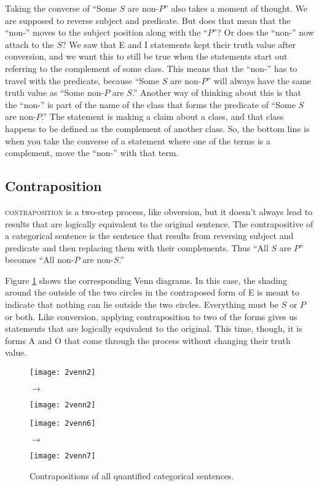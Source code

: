 Taking the converse of ``Some $S$ are non-$P$'' also takes a moment of thought. We are supposed to reverse subject and predicate. But does that mean that the ``non-'' moves to the subject position along with the ``$P$''? Or does the ``non-'' now attach to the $S$? We saw that E and I statements kept their truth value after conversion, and we want this to still be true when the statements start out referring to the complement of some class. This means that the ``non-'' has to travel with the predicate, because ``Some $S$ are non-$P$'' will always have the same truth value as ``Some non-$P$ are $S$.'' Another way of thinking about this is that the ``non-'' is part of the name of the class that forms the predicate of ``Some $S$ are non-$P$.'' The statement is making a claim about a class, and that class happens to be defined as the complement of another class. So, the bottom line is when you take the converse of a statement where one of the terms is a complement, move the ``non-'' with that term.

\subsection{Contraposition}



\textsc{\gls{contraposition}} is a two-step process, like obversion, but it doesn't always lead to results that are logically equivalent to the original sentence. The contrapositive of a categorical sentence is the sentence that results from reversing subject and predicate and then replacing them with their complements. Thus ``All $S$ are $P$'' becomes ``All non-$P$ are non-$S$.''

Figure \ref{fig:contraposition} shows the corresponding Venn diagrams. In this case, the shading around the outside of the two circles in the contraposed form of E is meant to indicate that nothing can lie outside the two circles. Everything must be $S$ or $P$ or both. Like conversion, applying contraposition to two of the forms gives us statements that are logically equivalent to the original. This time, though, it is forms A and O that come through the process without changing their truth value.


\begin{figure}[!ht]
\texttt{[image: 2venn2]}
\begin{minipage}[c]{0.1\textwidth}\vspace{-2.5cm}\hspace{.4cm}$\to$\end{minipage}
\texttt{[image: 2venn2]}

\texttt{[image: 2venn6]}
\begin{minipage}[c]{0.1\textwidth}\vspace{-2.5cm}\hspace{.4cm}$\to$\end{minipage}
\texttt{[image: 2venn7]}
\caption{Contrapositions of all quantified categorical sentences.}
\label{fig:contraposition}
\end{figure}


